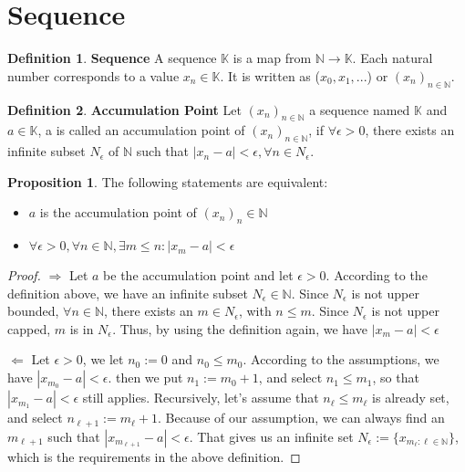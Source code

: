 \documentclass{article}
\theoremstyle{definition}
\newtheorem{defi}{Definition}[subsection]
\newtheorem{prop}{Proposition}[subsection]
\begin{document}
\section{Sequence}
\begin{defi}
\textbf{Sequence} A sequence $\mathbb{K}$ is a map from $\mathbb{N} \to \mathbb{K}$. Each natural number corresponds to a value $x_n \in \mathbb{K}$. It is written as ($x_0, x_1,...$) or $(x_n)_{n\in \mathbb{N}}$.
\end{defi}

\begin{defi}
\textbf{Accumulation Point} Let $(x_n)_{n\in \mathbb{N}}$ a sequence named $\mathbb{K}$ and $a\in \mathbb{K}$, a is called an accumulation point of $(x_n)_{n\in \mathbb{N}}$, if $\forall \epsilon>0$, there exists an infinite subset $N_\epsilon$ of $\mathbb{N}$ such that $|x_n - a|<\epsilon, \forall n\in N_\epsilon$.
\end{defi}

\begin{prop}
\label{prop_of_accumulation_point}
The following statements are equivalent:
\begin{itemize}
    \item $a$ is the accumulation point of $(x_n)_n\in \mathbb{N}$
    \item $\forall\epsilon >0, \forall n\in \mathbb{N}, \exists m \leq n: |x_m-a|<\epsilon$
\end{itemize}
\begin{proof}

$\Rightarrow$ Let $a$ be the accumulation point and let $\epsilon>0$. According to the definition above, we have an infinite subset $N_{\epsilon}\in \mathbb{N}$. Since $N_{\epsilon}$ is not upper bounded, $\forall n\in \mathbb{N}$, there exists an $m\in N_\epsilon$, with $n \leq m$. Since $N_\epsilon$ is not upper capped, $m$ is in $N_\epsilon$. Thus, by using the definition again, we have $|x_m-a|<\epsilon$

$\Leftarrow$ Let $\epsilon>0$, we let $n_0:=0$ and $n_0 \leq m_0$. According to the assumptions, we have $|x_{m_0}-a|<\epsilon$. then we put $n_1:=m_0+1$, and select $n_1 \leq m_1$, so that $|x_{m_1}-a|<\epsilon$ still applies. Recursively, let's assume that $n_\ell \leq m_\ell$ is already set, and select $n_{\ell+1}:= m_\ell + 1$. Because of our assumption, we can always find an $m_{\ell+1}$ such that $|x_{m_{\ell+1}}-a|<\epsilon$. That gives us an infinite set $N_\epsilon := \{x_{m_{\ell}: \ell \in\mathbb{N}}\}$, which is the requirements in the above definition.
\end{proof}
\end{prop}
\end{document}
